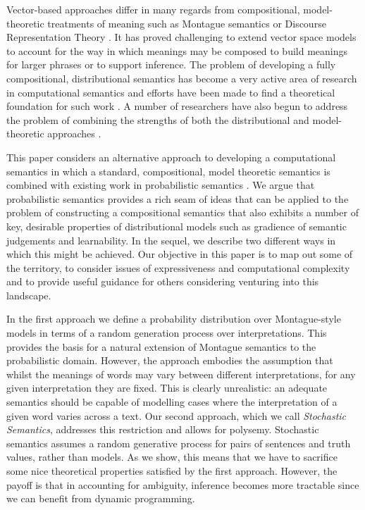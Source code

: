 \documentclass[11pt]{article}
\theoremstyle{definition}
\begin{document}
Vector-based approaches 
differ in many regards from compositional, model-theoretic treatments of meaning such as Montague semantics or Discourse Representation Theory \cite{Kamp:93}. It has proved challenging to extend vector space models to account for the way in which meanings may be composed to build meanings for larger phrases or to support inference. The problem of developing a fully compositional, distributional semantics has become a very active area of research in computational semantics \cite{Widdows:08,Mitchell:08,Baroni2010,Garrette:11,Grefenstette:11,Socher:12,Lewis:13} and efforts have been made to find a theoretical foundation for such work \cite{Clarke:12,Kartsaklis:14}.  A number of researchers have also begun to address the problem of combining the strengths of both the distributional and model-theoretic approaches \cite{Clarke:07,Coecke:10,Garrette:11,Lewis:13}. 

This paper considers an alternative approach to developing a computational semantics in which a standard, compositional, model theoretic semantics is combined with  existing work in probabilistic semantics \cite{Gaifman:64,Nilsson:86,Sato:95}. We argue that probabilistic semantics provides a rich seam of ideas that can be applied to the problem of constructing a compositional semantics that also exhibits a number of key, desirable properties  of distributional models such as gradience of semantic judgements and learnability. In the sequel, we describe two different ways in which this might be achieved. Our objective in this paper is to map out some of the territory,  to consider issues of expressiveness and computational complexity and to provide useful guidance for others considering venturing into this landscape. 

In the first approach we define a probability distribution over Montague-style models in terms of a random generation process over interpretations. This provides the basis for a natural extension of Montague semantics to the probabilistic domain.  However, the approach embodies the assumption that whilst the meanings of words may vary between different interpretations, for any given interpretation they are fixed. This is clearly unrealistic: an adequate semantics should be capable of modelling cases where the interpretation of a given word varies across a text. Our second approach, which we call \emph{Stochastic Semantics}, addresses this restriction and allows for polysemy. Stochastic semantics assumes a random generative process for pairs of sentences and truth values, rather than models. As we show, this means that we have to sacrifice some nice theoretical properties satisfied by the first approach. However, the payoff is that in accounting for ambiguity,
inference becomes more tractable since we can benefit from dynamic programming.
\end{document}
